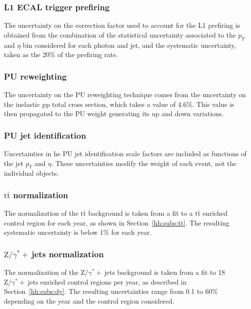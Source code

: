 \documentclass[../main.tex]{subfiles}
\begin{document}
\subsubsection*{L1 ECAL trigger prefiring}

The uncertainty on the correction factor used to account for the L1 prefiring is obtained from the combination of the statistical uncertainty associated to the $p_T$ and $\eta$ bin considered for each photon and jet, and the systematic uncertainty, taken as the 20\% of the prefiring rate.

\subsubsection*{PU reweighting}

The uncertainty on the PU reweighting technique comes from the uncertainty on the inelastic pp total cross section, which takes a value of 4.6\%. This value is then propagated to the PU weight generating its up and down variations.

\subsubsection{PU jet identification}

Uncertainties in he PU jet identification scale factors are included as functions of the jet $p_T$ and $\eta$. These uncertainties modify the weight of each event, not the individual objects.

\subsubsection*{$\text{t}\bar{\text{t}}$ normalization}

The normalization of the $\text{t}\bar{\text{t}}$ background is taken from a fit to a $\text{t}\bar{\text{t}}$ enriched control region for each year, as shown in Section~\ref{hh:subs:tt}. The resulting systematic uncertainty is below 1\% for each year.

\subsubsection*{$\text{Z}/\gamma^*+~$jets normalization}

The normalization of the $\text{Z}/\gamma^*+~$jets background is taken from a fit to 18 $\text{Z}/\gamma^*+~$jets enriched control regions per year, as described in Section~\ref{hh:subs:dy}. The resulting uncertainties range from 0.1 to 60\% depending on the year and the control region considered.
\end{document}
